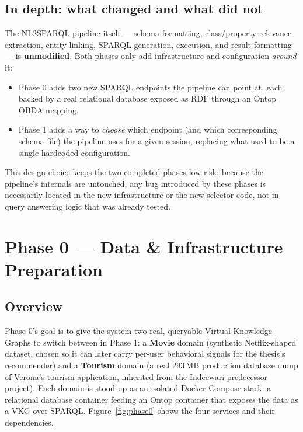 \documentclass[11pt,a4paper]{article}
\begin{document}
\subsection{In depth: what changed and what did not}

The NL2SPARQL pipeline itself --- schema formatting, class/property relevance extraction, entity
linking, SPARQL generation, execution, and result formatting --- is \textbf{unmodified}. Both
phases only add infrastructure and configuration \emph{around} it:

\begin{itemize}
    \item Phase 0 adds two new SPARQL endpoints the pipeline can point at, each backed by a real
        relational database exposed as RDF through an Ontop OBDA mapping.
    \item Phase 1 adds a way to \emph{choose} which endpoint (and which corresponding schema
        file) the pipeline uses for a given session, replacing what used to be a single
        hardcoded configuration.
    \end{itemize}

This design choice keeps the two completed phases low-risk: because the pipeline's internals are
untouched, any bug introduced by these phases is necessarily located in the new infrastructure or
the new selector code, not in query answering logic that was already tested.

\newpage
\section{Phase 0 --- Data \& Infrastructure Preparation}

\subsection{Overview}

Phase 0's goal is to give the system two real, queryable Virtual Knowledge Graphs to switch
between in Phase 1: a \textbf{Movie} domain (synthetic Netflix-shaped dataset, chosen so it can
later carry per-user behavioral signals for the thesis's recommender) and a \textbf{Tourism}
domain (a real 293\,MB production database dump of Verona's tourism application, inherited from
the Indeewari predecessor project). Each domain is stood up as an isolated Docker Compose stack:
a relational database container feeding an Ontop container that exposes the data as a VKG over
SPARQL. Figure~\ref{fig:phase0} shows the four services and their dependencies.
\end{document}
